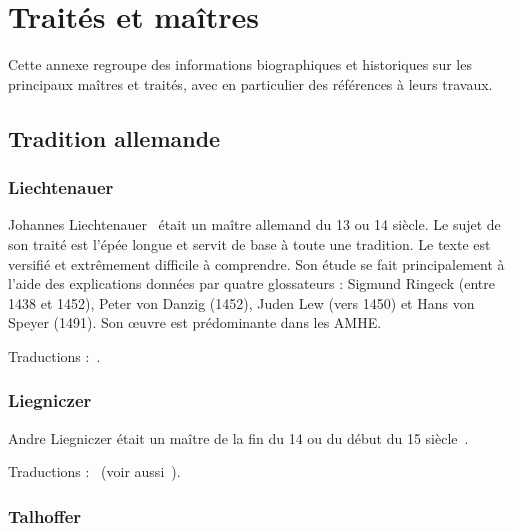 \chapter{Traités et maîtres}


Cette annexe regroupe des informations biographiques et historiques sur les principaux maîtres et traités, avec en particulier des références à leurs travaux.


\section{Tradition allemande}


\subsection{Liechtenauer}
\label{app:maitres:liechtenauer}

Johannes Liechtenauer~\cite{wiktenauer:liechtenauer} était un maître allemand du 13\ieme{} ou 14\ieme{} siècle.
Le sujet de son traité est l'épée longue et servit de base à toute une tradition.
Le texte est versifié et extrêmement difficile à comprendre.
Son étude se fait principalement à l'aide des explications données par quatre glossateurs : Sigmund Ringeck (entre 1438 et 1452), Peter von Danzig (1452), Juden Lew (vers 1450) et Hans von Speyer (1491).
Son œuvre est prédominante dans les AMHE.

Traductions :~\cite{ardamhe:tetraptyque, farrell:ringeck, lindholm:ringeck_longsword:2008}.


\subsection{Liegniczer}
\label{app:maitres:liegniczer}

Andre Liegniczer était un maître de la fin du 14\ieme{} ou du début du 15\ieme{} siècle~\cite{wiktenauer:liegniczer}.

Traductions :~\cite{ardamhe:liegniczer, lindholm:ringeck_others:2006} (voir aussi~\cite{youtube:sala_armi:liegniczer, youtube:memag:liegniczer}).


\subsection{Talhoffer}
\label{app:maitres:talhoffer}

